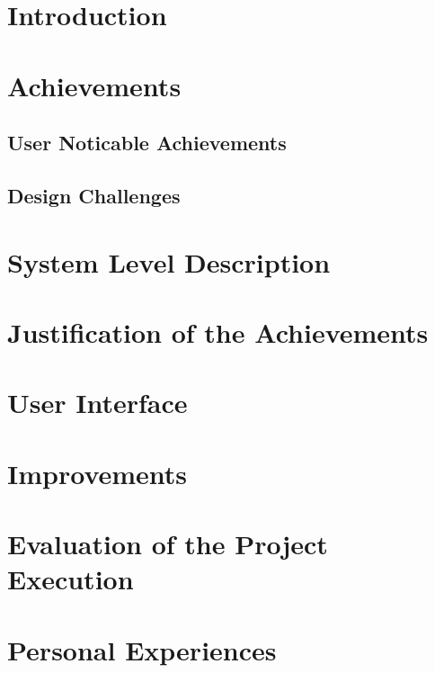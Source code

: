 \pagestyle{plain}
\setcounter{page}{1}

\section{Introduction}\label{cha:intro}


\section{Achievements}\label{cha:achievements}
  \subsection{User Noticable Achievements}\label{sec:userachievments}
  

  \subsection{Design Challenges}\label{sec:designchallenges}
  

\section{System Level Description}\label{cha:syslvl}


\section{Justification of the Achievements}\label{cha:justice}


\section{User Interface}\label{cha:ui}


\section{Improvements}\label{cha:improvements}


\section{Evaluation of the Project Execution}\label{cha:eval}


\section{Personal Experiences}\label{cha:personalexp}
